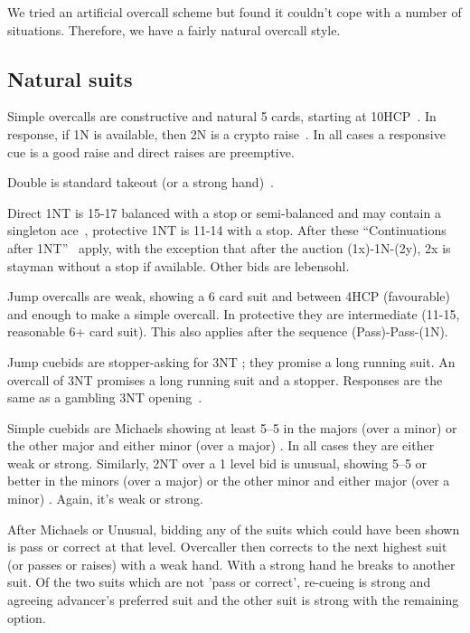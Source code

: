 \documentclass[a4paper,14pt]{extarticle}
\begin{document}
We tried an artificial overcall scheme but found it couldn't cope with a number of situations.
Therefore, we have a fairly natural overcall style.

\subsection{Natural suits}
\label{sec:def:1x}

Simple overcalls are constructive and natural 5 cards, starting at
10HCP~. In response, if 1N is available, then 2N is a crypto
raise~. In all cases a responsive cue is a good raise and
direct raises are preemptive.

Double is standard takeout (or a strong hand)~.

Direct 1NT is 15-17 balanced with a stop or semi-balanced and may contain a
singleton ace~, protective 1NT is 11-14 with a stop.  After these
``Continuations after 1NT''~ apply, with the exception that
after the auction (1x)-1N-(2y), 2x is stayman without a stop if available.
Other bids are lebensohl.

Jump overcalls are weak, showing a 6 card suit and between 4HCP (favourable)
and enough to make a simple overcall. In protective they are intermediate
(11-15, reasonable 6+ card suit). This also applies after the sequence (Pass)-Pass-(1N).

Jump cuebids are stopper-asking for 3NT ; they promise a long
running suit.  An overcall of 3NT promises a long running suit and a stopper.
Responses are the same as a gambling 3NT opening~.


Simple cuebids are Michaels showing at least 5--5 in the majors (over a minor)
or the other major and either minor (over a major) . In all cases they are
either weak or strong. Similarly, 2NT over a 1 level bid is unusual, showing
5--5 or better in the minors (over a major) or the other minor and either major
(over a minor) . Again, it's weak or strong.

After Michaels or Unusual, bidding any of the suits which could have been shown
is pass or correct at that level. Overcaller then corrects to the next highest
suit (or passes or raises) with a weak hand. With a strong hand he breaks to
another suit. Of the two suits which are not 'pass or correct', re-cueing is
strong and agreeing advancer's preferred suit and the other suit is strong with
the remaining option.
\end{document}
